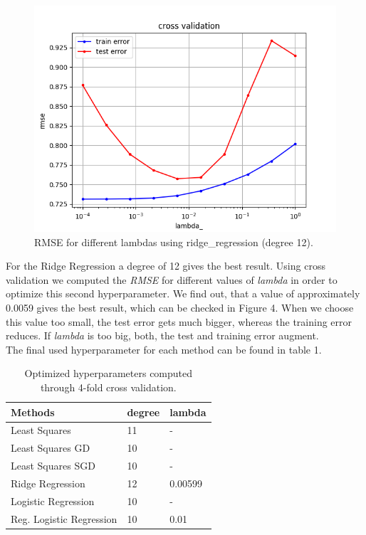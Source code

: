 \documentclass[10pt,conference,compsocconf]{IEEEtran}
\begin{document}
\begin{figure}[htbp]
	\centering
	\includegraphics[width=\columnwidth]{cross_validation_ridge_degree_12.png}
	\caption{RMSE for different lambdas using ridge\_regression (degree 12).}
	\vspace{-3mm}
	\label{fig:crossvalidationridge}
\end{figure}
 For the Ridge Regression a degree of 12 gives the best result. Using cross validation we computed the \textit{RMSE} for different values of \textit{lambda} in order to optimize this second hyperparameter. We find out, that a value of approximately 0.0059 gives the best result, which can be checked in Figure 4. When we choose this value too small, the test error gets much bigger, whereas the training error reduces. If \textit{lambda} is too big, both, the test and training error augment.\\
 The final used hyperparameter for each method can be found in table 1.\\


\begin{table}[htbp]
	\centering
	\begin{tabular}[c]{|l||l|l|}
		\hline
		Methods&degree&lambda\\
		\hline
		Least Squares& 11 &-\\
		Least Squares GD& 10 & -\\
		Least Squares SGD & 10 &-\\		Ridge Regression&12&0.00599\\
		Logistic Regression & 10&-\\
		Reg. Logistic Regression&10&0.01\\
		\hline
	\end{tabular}
	\caption{Optimized hyperparameters computed\\ through 4-fold cross validation.}
	\label{tab:hyperpam}
\end{table}
\end{document}
